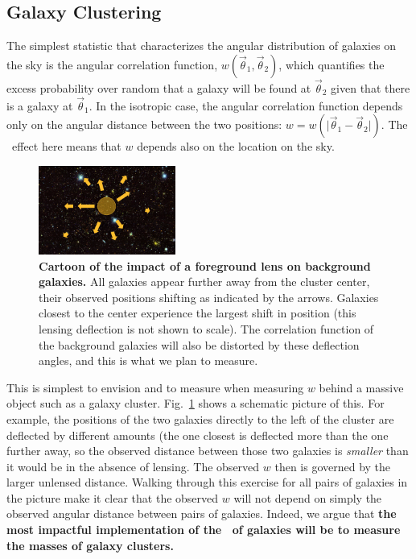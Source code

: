\subsection{Galaxy Clustering}\label{sec:lia}


The simplest statistic that
characterizes the angular distribution of galaxies on the sky is the
angular correlation function, $w(\vec\theta_1,\vec\theta_2)$, which
quantifies the excess probability over random that a galaxy will be
found at $\vec\theta_2$ given that there is a galaxy at
$\vec\theta_1$. In the isotropic case, the angular correlation function depends only on the angular distance
between the two positions: $w=w(\vert\vec\theta_1-\vec\theta_2\vert)$. The \atf\ effect here means
that $w$ depends also on the location on the sky.

\begin{figure}
\centering
\includegraphics[width=0.4\textwidth]{figs/clusterfig.jpg}
  \caption{ \footnotesize
{\bf Cartoon of the impact of a foreground lens on
  background galaxies.} All galaxies appear further away from the
  cluster center, their observed positions shifting as
  indicated by the arrows. Galaxies closest to the center experience
  the largest shift in position (this 
lensing deflection is not shown to scale). The correlation function
of the background galaxies will also be distorted by these deflection
angles, and this is what we plan to measure.}
  \label{cluster}
\end{figure}

This is simplest to envision and to measure when measuring $w$ behind a massive object such as a galaxy cluster. 
Fig.~\ref{cluster} shows a schematic picture of this. For example, the positions of the two galaxies directly to the left of the cluster are deflected by different amounts (the one closest is deflected more than the one further away, so the observed distance between those two galaxies is {\it smaller} than it would be in the absence of lensing. The observed $w$ then is governed by the larger unlensed distance. Walking through this exercise for all pairs of galaxies in the picture make it clear that the observed $w$ will not depend on simply the observed angular distance between pairs of galaxies. Indeed, we argue that {\bf the 
most impactful implementation of the \atf\ of galaxies will be to measure the masses of galaxy clusters.}


